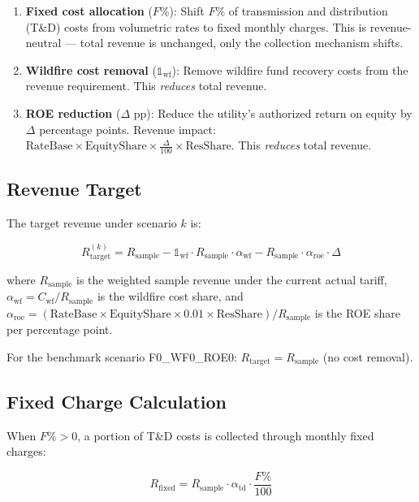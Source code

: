 \documentclass[11pt]{article}
\begin{document}
\begin{enumerate}
    \item \textbf{Fixed cost allocation} ($F\%$): Shift $F\%$ of transmission and distribution (T\&D) costs from volumetric rates to fixed monthly charges. This is revenue-neutral --- total revenue is unchanged, only the collection mechanism shifts.

    \item \textbf{Wildfire cost removal} ($\mathbb{1}_{\text{wf}}$): Remove wildfire fund recovery costs from the revenue requirement. This \textit{reduces} total revenue.

    \item \textbf{ROE reduction} ($\Delta$ pp): Reduce the utility's authorized return on equity by $\Delta$ percentage points. Revenue impact: $\text{RateBase} \times \text{EquityShare} \times \frac{\Delta}{100} \times \text{ResShare}$. This \textit{reduces} total revenue.
\end{enumerate}

\subsection{Revenue Target}

The target revenue under scenario $k$ is:

\begin{equation}
    R_{\text{target}}^{(k)} = R_{\text{sample}} - \mathbb{1}_{\text{wf}} \cdot R_{\text{sample}} \cdot \alpha_{\text{wf}} - R_{\text{sample}} \cdot \alpha_{\text{roe}} \cdot \Delta
\end{equation}

where $R_{\text{sample}}$ is the weighted sample revenue under the current actual tariff, $\alpha_{\text{wf}} = C_{\text{wf}} / R_{\text{sample}}$ is the wildfire cost share, and $\alpha_{\text{roe}} = (\text{RateBase} \times \text{EquityShare} \times 0.01 \times \text{ResShare}) / R_{\text{sample}}$ is the ROE share per percentage point.

For the benchmark scenario F0\_WF0\_ROE0: $R_{\text{target}} = R_{\text{sample}}$ (no cost removal).

\subsection{Fixed Charge Calculation}

When $F\% > 0$, a portion of T\&D costs is collected through monthly fixed charges:

\begin{equation}
    R_{\text{fixed}} = R_{\text{sample}} \cdot \alpha_{\text{td}} \cdot \frac{F\%}{100}
\end{equation}
\end{document}
